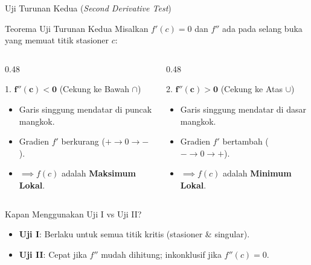 \documentclass[aspectratio=43,10pt]{beamer}
\begin{document}
\begin{frame}{Uji Turunan Kedua (\textit{Second Derivative Test})}
    \begin{block}{Teorema Uji Turunan Kedua}
        Misalkan $f'(c) = 0$ dan $f''$ ada pada selang buka yang memuat titik stasioner $c$:
    \end{block}

    \vspace{0.06cm}
    \begin{columns}[T]
        \begin{column}{0.48\textwidth}
            \begin{alertblock}{1. $\mathbf{f''(c) < 0}$ (Cekung ke Bawah $\cap$)}
                \begin{itemize}
                    \item Garis singgung mendatar di puncak mangkok.
                    \item Gradien $f'$ berkurang ($+ \to 0 \to -$).
                    \item $\implies f(c)$ adalah \textbf{Maksimum Lokal}.
                \end{itemize}
            \end{alertblock}
        \end{column}

        \begin{column}{0.48\textwidth}
            \begin{exampleblock}{2. $\mathbf{f''(c) > 0}$ (Cekung ke Atas $\cup$)}
                \begin{itemize}
                    \item Garis singgung mendatar di dasar mangkok.
                    \item Gradien $f'$ bertambah ($- \to 0 \to +$).
                    \item $\implies f(c)$ adalah \textbf{Minimum Lokal}.
                \end{itemize}
            \end{exampleblock}
        \end{column}
    \end{columns}

    \vspace{0.06cm}
    \begin{block}{Kapan Menggunakan Uji I vs Uji II?}
        \begin{itemize}
            \item \textbf{Uji I}: Berlaku untuk semua titik kritis (stasioner \& singular).
            \item \textbf{Uji II}: Cepat jika $f''$ mudah dihitung; inkonklusif jika $f''(c) = 0$.
        \end{itemize}
    \end{block}
\end{frame}
\end{document}
